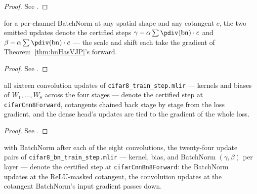 \begin{proof}
\leanok
See .
\end{proof}

\begin{theorem}
  \label{thm:cifar_bn_fold}
  \leanok
  \Prove{} for a per-channel BatchNorm at any spatial shape and any
  cotangent \(c\), the two emitted updates denote the certified steps
  \(\gamma - \alpha \sum \pdiv(\mathrm{bn})\cdot c\) and
  \(\beta - \alpha \sum \pdiv(\mathrm{bn})\cdot c\) --- the scale and shift each
  take the gradient of Theorem~\ref{thm:bnHasVJP}'s forward.
\end{theorem}

\begin{proof}
\leanok
See .
\end{proof}

\begin{theorem}
  \label{thm:cifar8_step_tie}
  \leanok
  \Prove{} all sixteen convolution updates of
  \texttt{cifar8\_train\_step.mlir} --- kernels and biases of \(W_1, \dots, W_8\)
  across the four stages --- denote the certified step at
  \texttt{cifarCnn8Forward}, cotangents chained back stage by stage from the
  loss gradient, and the dense head's updates are tied to the gradient of the
  whole loss.
\end{theorem}

\begin{proof}
\leanok
See .
\end{proof}

\begin{theorem}
  \label{thm:cifar8bn_step_tie}
  \leanok
  \Prove{} with BatchNorm after each of the eight convolutions, the
  twenty-four update pairs of \texttt{cifar8\_bn\_train\_step.mlir} --- kernel,
  bias, and BatchNorm \((\gamma, \beta)\) per layer --- denote the certified
  step at \texttt{cifarCnnBn8Forward}: the BatchNorm updates at the
  ReLU-masked cotangent, the convolution updates at the cotangent BatchNorm's
  input gradient passes down.
\end{theorem}

